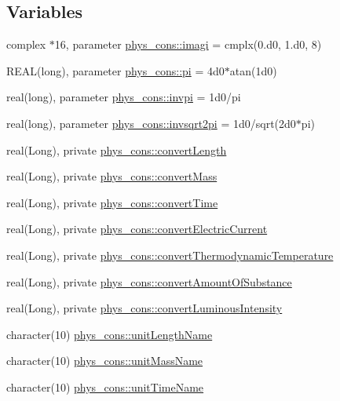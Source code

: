 \subsection*{Variables}
\begin{DoxyCompactItemize}
\item 
complex $\ast$16, parameter \hyperlink{namespacephys__cons_a0dbb22856790b16e206de451e9cdd74a}{phys\_\-cons::imagi} = cmplx(0.d0, 1.d0, 8)
\item 
REAL(long), parameter \hyperlink{namespacephys__cons_aae3c6cb8ae765b0262bb110ff739ba9d}{phys\_\-cons::pi} = 4d0$\ast$atan(1d0)
\item 
real(long), parameter \hyperlink{namespacephys__cons_aa8683f00f4216acc1822dfcb85b1ee00}{phys\_\-cons::invpi} = 1d0/pi
\item 
real(long), parameter \hyperlink{namespacephys__cons_a369d33713444a99a71f80a74c0652d4e}{phys\_\-cons::invsqrt2pi} = 1d0/sqrt(2d0$\ast$pi)
\item 
real(Long), private \hyperlink{namespacephys__cons_a6fe1cfa01be156ac1f0e51e3ab875f21}{phys\_\-cons::convertLength}
\item 
real(Long), private \hyperlink{namespacephys__cons_a48484815d32b74a1735ec19ba407ec5b}{phys\_\-cons::convertMass}
\item 
real(Long), private \hyperlink{namespacephys__cons_af758eccc104b85bbbc1974e3a9095849}{phys\_\-cons::convertTime}
\item 
real(Long), private \hyperlink{namespacephys__cons_a653404efc4f25713af588bb6cad2b39e}{phys\_\-cons::convertElectricCurrent}
\item 
real(Long), private \hyperlink{namespacephys__cons_ae5f9a067db27ea13f6e4028d29900df0}{phys\_\-cons::convertThermodynamicTemperature}
\item 
real(Long), private \hyperlink{namespacephys__cons_a1be0a1da47431668bd2e77c0486f831f}{phys\_\-cons::convertAmountOfSubstance}
\item 
real(Long), private \hyperlink{namespacephys__cons_a64a60f517bd29fbe4a14a5097df961f4}{phys\_\-cons::convertLuminousIntensity}
\item 
character(10) \hyperlink{namespacephys__cons_a54d8616222c422eac2f4ae16a5c3bcba}{phys\_\-cons::unitLengthName}
\item 
character(10) \hyperlink{namespacephys__cons_a424a8036980301898dba6635e916fbf3}{phys\_\-cons::unitMassName}
\item 
character(10) \hyperlink{namespacephys__cons_ab67dd4bef4aa3213b5b9b35ff02d01d9}{phys\_\-cons::unitTimeName}

\end{DoxyCompactItemize}
